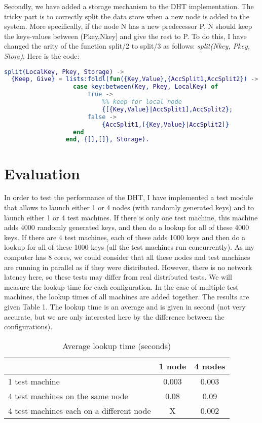 \documentclass[a4paper, 11pt]{article}
\begin{document}
Secondly, we have added a storage mechanism to the DHT implementation. The tricky part is to correctly split the data store when a new node is added to the system. More specifically,  if the node N has a new predecessor P, N should keep the keys-values between (Pkey,Nkey] and give the rest to P. To do this, I have changed the arity of the function split/2 to split/3 as follows: \textit{split(Nkey, Pkey, Store)}. Here is the code:
\begin{lstlisting}[language=erlang]
split(LocalKey, Pkey, Storage) ->
  {Keep, Give} = lists:foldl(fun({Key,Value},{AccSplit1,AccSplit2}) ->
                   case key:between(Key, Pkey, LocalKey) of
                       true ->
                           %% keep for local node
                           {[{Key,Value}|AccSplit1],AccSplit2};
                       false ->
                           {AccSplit1,[{Key,Value}|AccSplit2]}
                   end
                 end, {[],[]}, Storage).
\end{lstlisting}

\section{Evaluation}

In order to test the performance of the DHT, I have implemented a test module that allows to launch either 1 or 4 nodes (with randomly generated keys) and to launch either 1 or 4 test machines. If there is only one test machine, this machine adds 4000 randomly generated keys, and then do a lookup for all of these 4000 keys. If there are 4 test machines, each of these adds 1000 keys and then do a lookup for all of these 1000 keys (all the test machines run concurrently). As my computer has 8 cores, we could consider that all these nodes and test machines are running in parallel as if they were distributed. However, there is no network latency here, so these tests may differ from real distributed tests. We will measure the lookup time for each configuration. In the case of multiple test machines, the lookup times of all machines are added together.
The results are given Table 1. The lookup time is an average and is given in second (not very accurate, but we are only interested here by the difference between the configurations).

\begin{table}[h]
\centering
\begin{tabular}{lcc}
 & 1 node & 4 nodes \\\hline
1 test machine & 0.003 & 0.003\\\hline
4 test machines on the same node & 0.08 & 0.09\\\hline
4 test machines each on a different node & X & 0.002\\\hline
\end{tabular}
\caption{Average lookup time (seconds)}
\label{tab:results}
\end{table}
\end{document}
